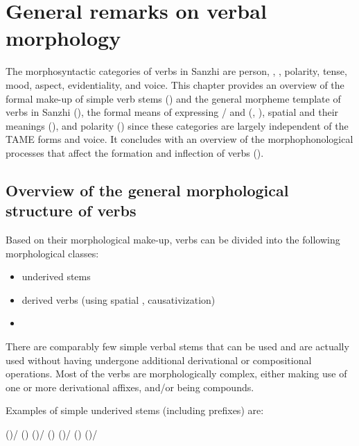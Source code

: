 \chapter{General remarks on verbal morphology}
\label{cpt:verbs}

The morphosyntactic categories of verbs in Sanzhi are person, , , polarity, tense, mood, aspect, evidentiality, and voice. This chapter provides an overview of the formal make-up of simple verb stems () and the general morpheme template of verbs in Sanzhi (), the formal means of expressing / and  (, ), spatial  and their meanings (), and polarity () since these categories are largely independent of the TAME forms and voice. It concludes with an overview of the morphophonological processes that affect the formation and inflection of verbs ().



\section{Overview of the general morphological structure of verbs}
\label{sec:Overview about the general morphological structure of verbs}

Based on their morphological make-up, verbs can be divided into the following morphological classes:
%
\begin{itemize}
	\item	underived stems
	\item	derived verbs (using spatial , causativization)
	\item	{}
\end{itemize}

There are comparably few simple verbal stems that can be used and are actually used without having undergone additional derivational or compositional operations. Most of the verbs are morphologically complex, either making use of one or more derivational affixes, and/or being compounds.

Examples of simple underived stems (including  prefixes) are:
%
\begin{exe}
	\ex	\label{ex:underived verbs verbs}
	\begin{xlist}
		\ex	 {} ()\slash{} () 
		\ex	{} ()\slash{} () 
		\ex	{} 
		\ex	{} ()\slash{} () 
		\ex	{} ()\slash{} 
	\end{xlist}
\end{exe}

